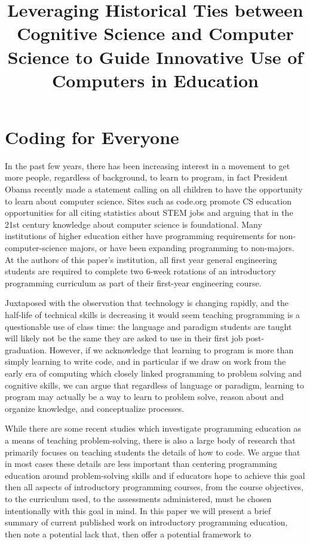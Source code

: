 \documentclass[12pt]{article}
\title{\large \textbf{Leveraging Historical Ties between Cognitive Science and
  Computer Science to Guide Innovative Use of Computers in Education}}
\author{}
\date{}
\begin{document}
\raggedright
\maketitle
\thispagestyle{empty}
\pagestyle{empty}

\section{Coding for Everyone}
In the past few years, there has been increasing interest in a
movement to get more people, regardless of background, to learn to
program, in fact President Obama recently made a statement calling on
all children to have the opportunity to learn about computer
science\autocite{whitehouse_computer_2016}. Sites such as code.org
promote CS education opportunities for all citing statistics about
STEM jobs and arguing that in the 21st century knowledge about
computer science is foundational\autocite{code.org_every_2016}. Many
institutions of higher education either have programming requirements
for non-computer-science majors, or have been expanding programming to
non-majors\autocite{rich_cs1_2004,forte_motivation_2005,guzdial_design_2005}. At
the authors of this paper's institution, all first year general
engineering students are required to complete two 6-week rotations of
an introductory programming curriculum as part of their first-year
engineering course.

Juxtaposed with the observation that technology is changing rapidly,
and the half-life of technical skills is
decreasing\autocite{nae_educating_2004} it would seem teaching
programming is a questionable use of class time: the language and
paradigm students are taught will likely not be the same they are
asked to use in their first job post-graduation. However, if we
acknowledge that learning to program is more than simply learning to
write code, and in particular if we draw on work from the early era of
computing which closely linked programming to problem solving and
cognitive skills, we can argue that regardless of language or
paradigm, learning to program may actually be a way to learn to
problem solve, reason about and organize knowledge, and conceptualize
processes.

While there are some recent studies which investigate programming
education as a means of teaching problem-solving, there is also a
large body of research that primarily focuses on teaching students the
details of how to code. We argue that in most cases these details are
less important than centering programming education around
problem-solving skills and if educators hope to achieve this goal then
all aspects of introductory programming courses, from the course
objectives, to the curriculum used, to the assessments administered,
must be chosen intentionally with this goal in mind. In this paper we
will present a brief summary of current published work on introductory programming education, then note a potential lack that, 
then offer a potential framework to 
\end{document}
